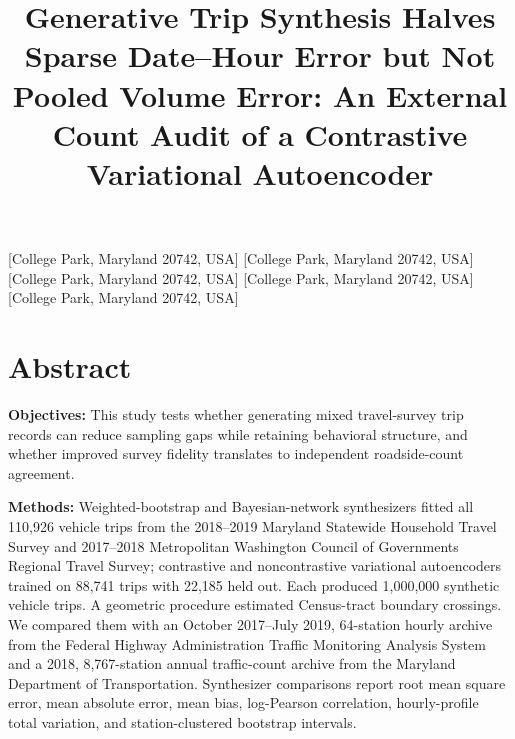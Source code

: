 \documentclass[numbered]{trbunofficial}
\begin{document}
\title{Generative Trip Synthesis Halves Sparse Date--Hour Error but Not Pooled Volume Error: An External Count Audit of a Contrastive Variational Autoencoder}

[College Park, Maryland 20742, USA]
[College Park, Maryland 20742, USA]
[College Park, Maryland 20742, USA]
[College Park, Maryland 20742, USA]
[College Park, Maryland 20742, USA]
\AuthorHeaders{}
\maketitle

\section{Abstract}
\noindent\textbf{Objectives:} This study tests whether generating mixed travel-survey trip records can reduce sampling gaps while retaining behavioral structure, and whether improved survey fidelity translates to independent roadside-count agreement.

\noindent\textbf{Methods:} Weighted-bootstrap and Bayesian-network synthesizers fitted all 110,926 vehicle trips from the 2018--2019 Maryland Statewide Household Travel Survey and 2017--2018 Metropolitan Washington Council of Governments Regional Travel Survey; contrastive and noncontrastive variational autoencoders trained on 88,741 trips with 22,185 held out. Each produced 1,000,000 synthetic vehicle trips. A geometric procedure estimated Census-tract boundary crossings. We compared them with an October 2017--July 2019, 64-station hourly archive from the Federal Highway Administration Traffic Monitoring Analysis System and a 2018, 8,767-station annual traffic-count archive from the Maryland Department of Transportation. Synthesizer comparisons report root mean square error, mean absolute error, mean bias, log-Pearson correlation, hourly-profile total variation, and station-clustered bootstrap intervals.
\end{document}

